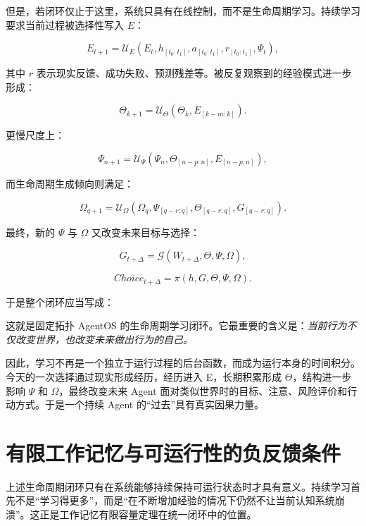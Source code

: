 但是，若闭环仅止于这里，系统只具有在线控制，而不是生命周期学习。持续学习要求当前过程被选择性写入 $E$：

\[
E_{t+1}
=
\mathcal{U}_E
\left(
E_t,
h_{[t_0:t_1]},
a_{[t_0:t_1]},
r_{[t_0:t_1]},
\Psi_t
\right),
\]

其中 $r$ 表示现实反馈、成功失败、预测残差等。被反复观察到的经验模式进一步形成：

\[
\Theta_{k+1}
=
\mathcal{U}_\Theta
(
\Theta_k,
E_{[k-m:k]}
).
\]

更慢尺度上：

\[
\Psi_{n+1}
=
\mathcal{U}_\Psi
(
\Psi_n,
\Theta_{[n-p:n]},
E_{[n-p:n]}
),
\]

而生命周期生成倾向则满足：

\[
\Omega_{q+1}
=
\mathcal{U}_\Omega
(
\Omega_q,
\Psi_{[q-r:q]},
\Theta_{[q-r:q]},
G_{[q-r:q]}
).
\]

最终，新的 $\Psi$ 与 $\Omega$ 又改变未来目标与选择：

\[
G_{t+\Delta}
=
\mathcal{G}
(
W_{t+\Delta},
\Theta,
\Psi,
\Omega
),
\]

\[
Choice_{t+\Delta}
=
\pi
(
h,
G,
\Theta,
\Psi,
\Omega
).
\]

于是整个闭环应当写成：

\begin{statementbox}
\centering
{}
\end{statementbox}

这就是固定拓扑 AgentOS 的生命周期学习闭环。它最重要的含义是：\emph{当前行为不仅改变世界，也改变未来做出行为的自己。}

因此，学习不再是一个独立于运行过程的后台函数，而成为运行本身的时间积分。今天的一次选择通过现实形成经历，经历进入 E，长期积累形成 $\Theta$，结构进一步影响 $\Psi$ 和 $\Omega$，最终改变未来 Agent 面对类似世界时的目标、注意、风险评价和行动方式。于是一个持续 Agent 的“过去”具有真实因果力量。

\section{有限工作记忆与可运行性的负反馈条件}

上述生命周期闭环只有在系统能够持续保持可运行状态时才具有意义。持续学习首先不是“学习得更多”，而是“在不断增加经验的情况下仍然不让当前认知系统崩溃”。这正是工作记忆有限容量定理在统一闭环中的位置。

